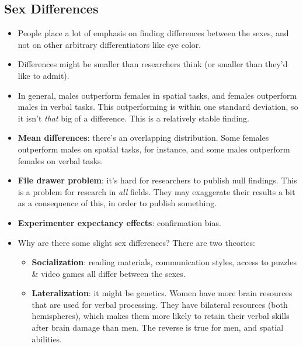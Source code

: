 \documentclass[]{article}
\begin{document}
		\subsection{Sex Differences}
			\begin{itemize}
				\item People place a lot of emphasis on finding differences between the sexes, and not on other arbitrary differentiators like eye color.
				\item Differences might be smaller than researchers think (or smaller than they'd like to admit).
				\item In general, males outperform females in spatial tasks, and females outperform males in verbal tasks. This outperforming is within one standard deviation, so it isn't \emph{that} big of a difference. This is a relatively stable finding.
				\item \textbf{Mean differences}: there's an overlapping distribution. Some females outperform males on spatial tasks, for instance, and some males outperform females on verbal tasks.
				\item \textbf{File drawer problem}: it's hard for researchers to publish null findings. This is a problem for research in \emph{all} fields. They may exaggerate their results a bit as a consequence of this, in order to publish something.
				\item \textbf{Experimenter expectancy effects}: confirmation bias.
				\item Why are there some slight sex differences? There are two theories:
					\begin{itemize}
						\item \textbf{Socialization}: reading materials, communication styles, access to puzzles \& video games all differ between the sexes.
						\item \textbf{Lateralization}: it might be genetics. Women have more brain resources that are used for verbal processing. They have bilateral resources (both hemispheres), which makes them more likely to retain their verbal skills after brain damage than men. The reverse is true for men, and spatial abilities.
					\end{itemize}
			\end{itemize}
			
\end{document}
